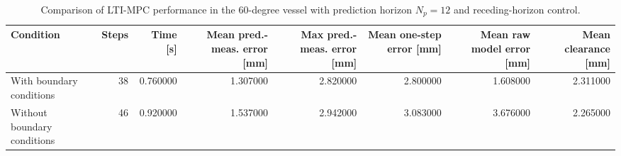 \begin{table}
\caption{Comparison of LTI-MPC performance in the 60-degree vessel with prediction horizon $N_p=12$ and receding-horizon control.}
\label{tab:lti_mpc_boundary_comparison}
\begin{tabular}{lrrrrrrr}
\toprule
Condition & Steps & Time [s] & Mean pred.-meas. error [mm] & Max pred.-meas. error [mm] & Mean one-step error [mm] & Mean raw model error [mm] & Mean clearance [mm] \\
\midrule
With boundary conditions & 38 & 0.760000 & 1.307000 & 2.820000 & 2.800000 & 1.608000 & 2.311000 \\
Without boundary conditions & 46 & 0.920000 & 1.537000 & 2.942000 & 3.083000 & 3.676000 & 2.265000 \\
\bottomrule
\end{tabular}
\end{table}
